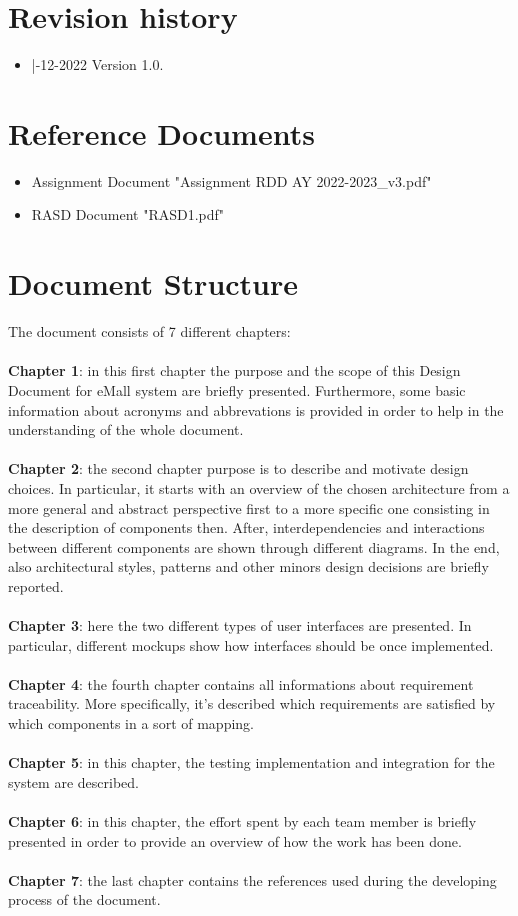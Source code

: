 \documentclass[a4paper]{report}
\begin{document}
\section{Revision history}
\begin{itemize}
\item |-12-2022 Version 1.0.
\end{itemize}
\section{Reference Documents}
\begin{itemize}
\item Assignment Document "Assignment RDD AY 2022-2023\_v3.pdf"
\item RASD Document "RASD1.pdf"
\end{itemize}
\section{Document Structure}

The document consists of 7 different chapters:
\\
\\
\textbf{Chapter 1}: in this first chapter the purpose and the scope of this Design Document for eMall system are briefly presented. Furthermore, some basic information about acronyms and abbrevations is provided in order to help in the understanding of the whole document.\\ \\
\textbf{Chapter 2}: the second chapter purpose is to describe and motivate design choices. In particular, it starts with an overview of the chosen architecture from a more general and abstract perspective first to a more specific one consisting in the description of components then. After, interdependencies and interactions between different components are shown through different diagrams. In the end, also architectural styles, patterns and other minors design decisions are briefly reported. \\ \\
\textbf{Chapter 3}: here the two different types of user interfaces are presented. In particular, different mockups show how interfaces should be once implemented.\\ \\
\textbf{Chapter 4}: the fourth chapter contains all informations about requirement traceability. More specifically, it's described which requirements are satisfied by which components in a sort of mapping.\\ \\
\textbf{Chapter 5}: in this chapter, the testing implementation and integration for the system are described.\\ \\
\textbf{Chapter 6}: in this chapter, the effort spent by each team member is briefly presented in order to provide an overview of how the work has been done.\\ \\
\textbf{Chapter 7}: the last chapter contains the references used during the developing process of the document.
\end{document}
